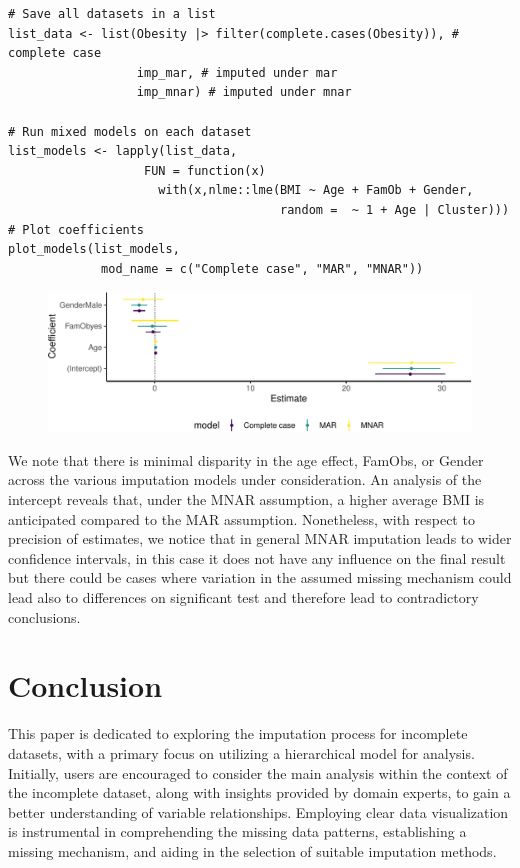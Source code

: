 \documentclass[
  article]{jss}
\begin{document}
\begin{verbatim}
# Save all datasets in a list
list_data <- list(Obesity |> filter(complete.cases(Obesity)), # complete case
                  imp_mar, # imputed under mar
                  imp_mnar) # imputed under mnar

# Run mixed models on each dataset
list_models <- lapply(list_data, 
                   FUN = function(x) 
                     with(x,nlme::lme(BMI ~ Age + FamOb + Gender, 
                                      random =  ~ 1 + Age | Cluster)))
# Plot coefficients
plot_models(list_models,
             mod_name = c("Complete case", "MAR", "MNAR"))
\end{verbatim}

\begin{figure}[h]

{\centering \includegraphics{manuscript_files/figure-pdf/models-1.pdf}

}

\end{figure}

We note that there is minimal disparity in the age effect, FamObs, or
Gender across the various imputation models under consideration. An
analysis of the intercept reveals that, under the MNAR assumption, a
higher average BMI is anticipated compared to the MAR assumption.
Nonetheless, with respect to precision of estimates, we notice that in
general MNAR imputation leads to wider confidence intervals, in this
case it does not have any influence on the final result but there could
be cases where variation in the assumed missing mechanism could lead
also to differences on significant test and therefore lead to
contradictory conclusions.

\hypertarget{conclusion}{%
\section{Conclusion}\label{conclusion}}

This paper is dedicated to exploring the imputation process for
incomplete datasets, with a primary focus on utilizing a hierarchical
model for analysis. Initially, users are encouraged to consider the main
analysis within the context of the incomplete dataset, along with
insights provided by domain experts, to gain a better understanding of
variable relationships. Employing clear data visualization is
instrumental in comprehending the missing data patterns, establishing a
missing mechanism, and aiding in the selection of suitable imputation
methods.
\end{document}
